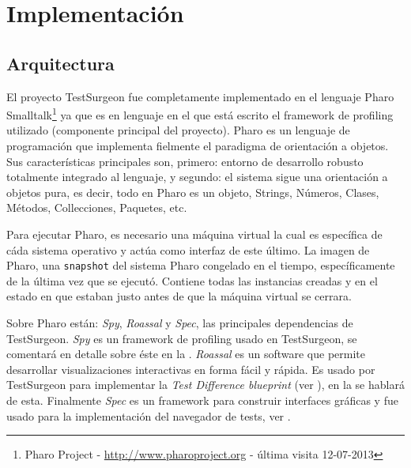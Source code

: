 \chapter{Implementación}


\section{Arquitectura}

\par El proyecto TestSurgeon fue completamente implementado en el lenguaje Pharo Smalltalk\footnote{Pharo Project - \url{http://www.pharoproject.org} - última visita 12-07-2013 } ya que es en lenguaje en el que está escrito el framework de profiling utilizado (componente principal del proyecto). Pharo es un lenguaje de programación que implementa fielmente el paradigma de orientación a objetos. Sus características principales son, primero: entorno de desarrollo robusto totalmente integrado al lenguaje, y segundo: el sistema sigue una orientación a objetos pura, es decir, todo en Pharo es un objeto, Strings, Números, Clases, Métodos, Collecciones, Paquetes, etc. 

\par Para ejecutar Pharo, es necesario una máquina virtual la cual es específica de cáda sistema operativo y actúa como interfaz de este último. La imagen de Pharo, una {\tt snapshot} del sistema Pharo congelado en el tiempo, específicamente de la última vez que se ejecutó. Contiene todas las instancias creadas y en el estado en que estaban justo antes de que la máquina virtual se cerrara.

\par Sobre Pharo están: \emph{Spy}, \emph{Roassal} y \emph{Spec}, las principales dependencias de TestSurgeon. \emph{Spy} es un framework de profiling usado en TestSurgeon, se comentará en detalle sobre éste en la . \emph{Roassal} es un software que permite desarrollar visualizaciones interactivas en forma fácil y rápida. Es usado por TestSurgeon para implementar la \emph{Test Difference blueprint} (ver ), en la  se hablará de esta. Finalmente \emph{Spec} es un framework para construir interfaces gráficas y fue usado para la implementación del navegador de tests, ver .



